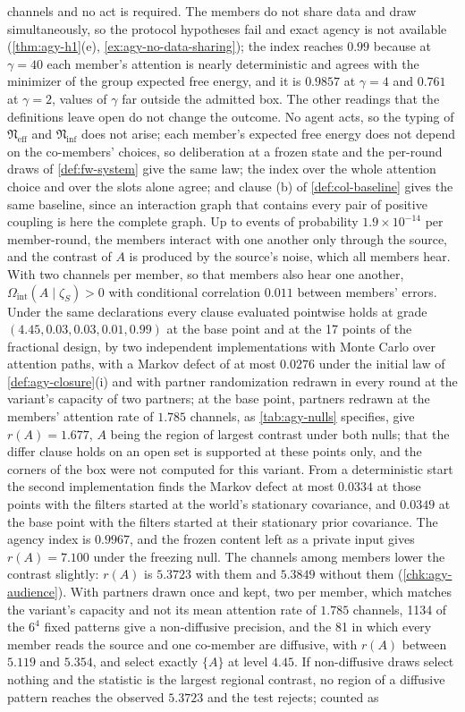 channels and no act is required. The members do not share data and draw simultaneously, so the protocol hypotheses fail and exact agency is not available (\cref{thm:agy-h1}(e), \cref{ex:agy-no-data-sharing}); the index reaches $0.99$ because at $\gamma=40$ each member's attention is nearly deterministic and agrees with the minimizer of the group expected free energy, and it is $0.9857$ at $\gamma=4$ and $0.761$ at $\gamma=2$, values of $\gamma$ far outside the admitted box. The other readings that the definitions leave open do not change the outcome. No agent acts, so the typing of $\mathfrak N_{\mathrm{eff}}$ and $\mathfrak N_{\mathrm{inf}}$ does not arise; each member's expected free energy does not depend on the co-members' choices, so deliberation at a frozen state and the per-round draws of \cref{def:fw-system} give the same law; the index over the whole attention choice and over the slots alone agree; and clause (b) of \cref{def:col-baseline} gives the same baseline, since an interaction graph that contains every pair of positive coupling is here the complete graph. Up to events of probability $1.9\times10^{-14}$ per member-round, the members interact with one another only through the source, and the contrast of $A$ is produced by the source's noise, which all members hear. With two channels per member, so that members also hear one another, $\Omega_{\mathrm{int}}(A\mid\zeta_S)>0$ with conditional correlation $0.011$ between members' errors. Under the same declarations every clause evaluated pointwise holds at grade $(4.45,0.03,0.03,0.01,0.99)$ at the base point and at the 17 points of the fractional design, by two independent implementations with Monte Carlo over attention paths, with a Markov defect of at most $0.0276$ under the initial law of \cref{def:agy-closure}(i) and with partner randomization redrawn in every round at the variant's capacity of two partners; at the base point, partners redrawn at the members' attention rate of $1.785$ channels, as \cref{tab:agy-nulls} specifies, give $r(A)=1.677$, $A$ being the region of largest contrast under both nulls; that the differ clause holds on an open set is supported at these points only, and the corners of the box were not computed for this variant. From a deterministic start the second implementation finds the Markov defect at most $0.0334$ at those points with the filters started at the world's stationary covariance, and $0.0349$ at the base point with the filters started at their stationary prior covariance. The agency index is $0.9967$, and the frozen content left as a private input gives $r(A)=7.100$ under the freezing null. The channels among members lower the contrast slightly: $r(A)$ is $5.3723$ with them and $5.3849$ without them (\cref{chk:agy-audience}). With partners drawn once and kept, two per member, which matches the variant's capacity and not its mean attention rate of $1.785$ channels, 1134 of the $6^4$ fixed patterns give a non-diffusive precision, and the 81 in which every member reads the source and one co-member are diffusive, with $r(A)$ between $5.119$ and $5.354$, and select exactly $\{A\}$ at level $4.45$. If non-diffusive draws select nothing and the statistic is the largest regional contrast, no region of a diffusive pattern reaches the observed $5.3723$ and the test rejects; counted as 